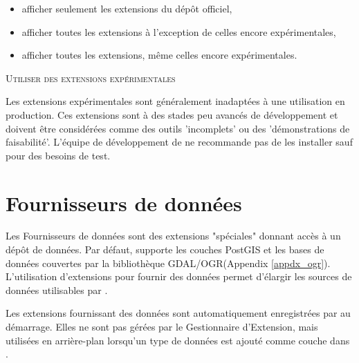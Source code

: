 \begin{itemize}[label=--]
\item afficher seulement les extensions du dépôt officiel,
\item afficher toutes les extensions à l'exception de celles encore expérimentales,
\item afficher toutes les extensions, même celles encore expérimentales.
\end{itemize}

\begin{Tip}
 \caption{\textsc{Utiliser des extensions expérimentales}}

Les extensions expérimentales sont généralement inadaptées à une utilisation en production. Ces extensions sont à des stades peu avancés de développement et doivent être considérées comme des outils 'incomplets' ou des 'démonstrations de faisabilité'. L'équipe de développement de \qg ne recommande pas de les installer sauf pour des besoins de test.
\end{Tip}


\section{Fournisseurs de données}


Les Fournisseurs de données sont des extensions "spéciales" donnant accès à un dépôt de données.
Par défaut, \qg supporte les couches PostGIS et les bases de données couvertes par la bibliothèque GDAL/OGR(Appendix \ref{appdx_ogr}).
L'utilisation d'extensions pour fournir des données permet d'élargir les sources de données utilisables par \qg.

Les extensions fournissant des données sont automatiquement enregistrées par \qg au démarrage.
Elles ne sont pas gérées par le Gestionnaire d'Extension, mais utilisées en arrière-plan lorsqu'un type de données est ajouté comme couche dans \qg.
